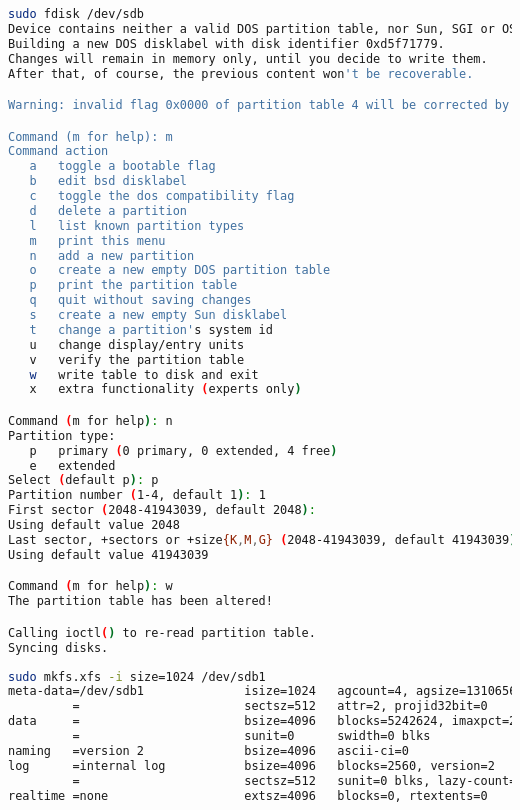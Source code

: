 \begin{lstlisting}[label=partition, language=Bash, caption=Partition auf zweiter Festplatte erstellen ]
sudo fdisk /dev/sdb 
Device contains neither a valid DOS partition table, nor Sun, SGI or OSF disklabel
Building a new DOS disklabel with disk identifier 0xd5f71779.
Changes will remain in memory only, until you decide to write them.
After that, of course, the previous content won't be recoverable.

Warning: invalid flag 0x0000 of partition table 4 will be corrected by w(rite)

Command (m for help): m
Command action
   a   toggle a bootable flag
   b   edit bsd disklabel
   c   toggle the dos compatibility flag
   d   delete a partition
   l   list known partition types
   m   print this menu
   n   add a new partition
   o   create a new empty DOS partition table
   p   print the partition table
   q   quit without saving changes
   s   create a new empty Sun disklabel
   t   change a partition's system id
   u   change display/entry units
   v   verify the partition table
   w   write table to disk and exit
   x   extra functionality (experts only)

Command (m for help): n
Partition type:
   p   primary (0 primary, 0 extended, 4 free)
   e   extended
Select (default p): p
Partition number (1-4, default 1): 1
First sector (2048-41943039, default 2048): 
Using default value 2048
Last sector, +sectors or +size{K,M,G} (2048-41943039, default 41943039): 
Using default value 41943039

Command (m for help): w
The partition table has been altered!

Calling ioctl() to re-read partition table.
Syncing disks.
\end{lstlisting}

\begin{lstlisting}[label=xfs, language=Bash, caption=XFS Dateisystem in der Partition anlegen ]
sudo mkfs.xfs -i size=1024 /dev/sdb1
meta-data=/dev/sdb1              isize=1024   agcount=4, agsize=1310656 blks
         =                       sectsz=512   attr=2, projid32bit=0
data     =                       bsize=4096   blocks=5242624, imaxpct=25
         =                       sunit=0      swidth=0 blks
naming   =version 2              bsize=4096   ascii-ci=0
log      =internal log           bsize=4096   blocks=2560, version=2
         =                       sectsz=512   sunit=0 blks, lazy-count=1
realtime =none                   extsz=4096   blocks=0, rtextents=0
\end{lstlisting}

